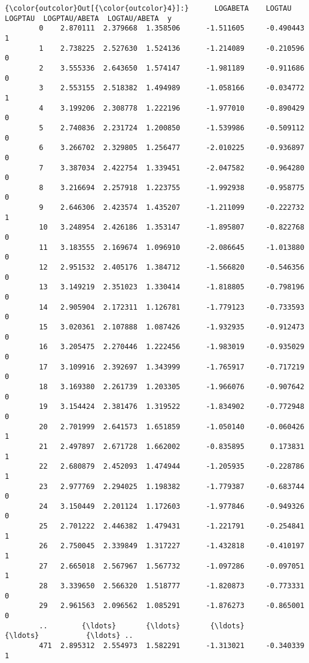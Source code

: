 \documentclass[11pt]{article}
\begin{document}
\begin{Verbatim}[commandchars=\\\{\}]
{\color{outcolor}Out[{\color{outcolor}4}]:}      LOGABETA    LOGTAU   LOGPTAU  LOGPTAU/ABETA  LOGTAU/ABETA  y
        0    2.870111  2.379668  1.358506      -1.511605     -0.490443  1
        1    2.738225  2.527630  1.524136      -1.214089     -0.210596  0
        2    3.555336  2.643650  1.574147      -1.981189     -0.911686  0
        3    2.553155  2.518382  1.494989      -1.058166     -0.034772  1
        4    3.199206  2.308778  1.222196      -1.977010     -0.890429  0
        5    2.740836  2.231724  1.200850      -1.539986     -0.509112  0
        6    3.266702  2.329805  1.256477      -2.010225     -0.936897  0
        7    3.387034  2.422754  1.339451      -2.047582     -0.964280  0
        8    3.216694  2.257918  1.223755      -1.992938     -0.958775  0
        9    2.646306  2.423574  1.435207      -1.211099     -0.222732  1
        10   3.248954  2.426186  1.353147      -1.895807     -0.822768  0
        11   3.183555  2.169674  1.096910      -2.086645     -1.013880  0
        12   2.951532  2.405176  1.384712      -1.566820     -0.546356  0
        13   3.149219  2.351023  1.330414      -1.818805     -0.798196  0
        14   2.905904  2.172311  1.126781      -1.779123     -0.733593  0
        15   3.020361  2.107888  1.087426      -1.932935     -0.912473  0
        16   3.205475  2.270446  1.222456      -1.983019     -0.935029  0
        17   3.109916  2.392697  1.343999      -1.765917     -0.717219  0
        18   3.169380  2.261739  1.203305      -1.966076     -0.907642  0
        19   3.154424  2.381476  1.319522      -1.834902     -0.772948  0
        20   2.701999  2.641573  1.651859      -1.050140     -0.060426  1
        21   2.497897  2.671728  1.662002      -0.835895      0.173831  1
        22   2.680879  2.452093  1.474944      -1.205935     -0.228786  1
        23   2.977769  2.294025  1.198382      -1.779387     -0.683744  0
        24   3.150449  2.201124  1.172603      -1.977846     -0.949326  0
        25   2.701222  2.446382  1.479431      -1.221791     -0.254841  1
        26   2.750045  2.339849  1.317227      -1.432818     -0.410197  1
        27   2.665018  2.567967  1.567732      -1.097286     -0.097051  1
        28   3.339650  2.566320  1.518777      -1.820873     -0.773331  0
        29   2.961563  2.096562  1.085291      -1.876273     -0.865001  0
        ..        {\ldots}       {\ldots}       {\ldots}            {\ldots}           {\ldots} ..
        471  2.895312  2.554973  1.582291      -1.313021     -0.340339  1

\end{Verbatim}
\end{document}
